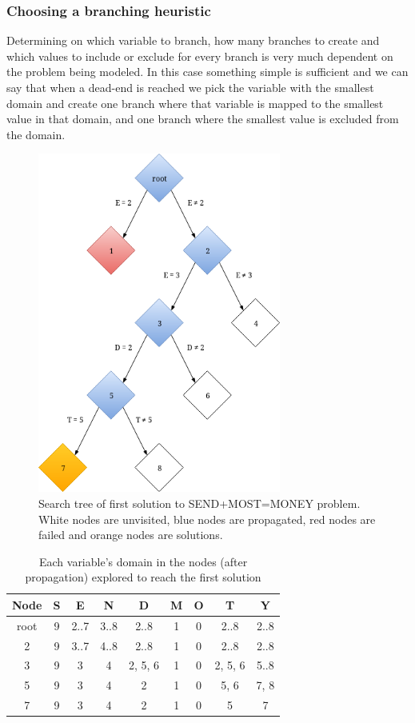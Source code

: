 \subsubsection{Choosing a branching heuristic}

Determining on which variable to branch, how many branches to create and which values to
include or exclude for every branch is very much dependent on the problem being modeled.
In this case something simple is sufficient and we can say that when a dead-end is reached
we pick the variable with the smallest domain and create one branch where that variable
is mapped to the smallest value in that domain, and one branch where the smallest value
is excluded from the domain.

\begin{figure}[h]
	\centering
	\includegraphics[width=8cm]{background/constraint-programming/figures/constraint_first_solution}
	\caption{Search tree of first solution to SEND+MOST=MONEY problem.
	White nodes are unvisited, blue nodes are propagated, red nodes are failed and orange nodes are solutions.}
	\label{fig:first_solution}
\end{figure}

\begin{table}
	\centering
	\begin{tabular}{c|c|c|c|c|c|c|c|c}
		Node & S & E & N & D & M & O & T & Y \\
		\hline
		root & 9 & {2..7} & {3..8} & {2..8} & 1 & 0 & {2..8} & {2..8} \\
		2 & 9 & {3..7} & {4..8} & {2..8} & 1 & 0 & {2..8} & {2..8} \\
		3 & 9 & 3 & 4 & {2, 5, 6} & 1 & 0 & {2, 5, 6} & {5..8} \\
		5 & 9 & 3 & 4 & 2 & 1 & 0 & {5, 6} & {7, 8} \\
		7 & 9 & 3 & 4 & 2 & 1 & 0 & 5 & 7 \\
	\end{tabular}
	\caption{Each variable's domain in the nodes (after propagation) explored to reach the first solution}
	\label{tab:first_solution_states}
\end{table}

